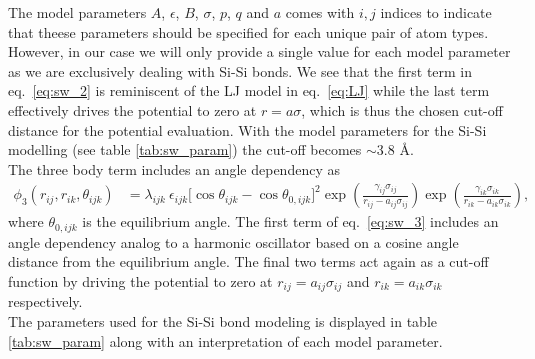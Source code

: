 The model parameters $A$, $\epsilon$, $B$, $\sigma$, $p$, $q$ and $a$ comes with $i,j$ indices to indicate that theese parameters should be specified for each unique pair of atom types. However, in our case we will only provide a single value for each model parameter as we are exclusively dealing with Si-Si bonds. We see that the first term in eq.~\eqref{eq:sw_2} is reminiscent of the LJ model in eq.~\eqref{eq:LJ} while the last term effectively drives the potential to zero at $r=a\sigma$, which is thus the chosen cut-off distance for the potential evaluation. With the model parameters for the Si-Si modelling (see table \ref{tab:sw_param}) the cut-off becomes $\sim 3.8$ Å. \\
The three body term includes an angle dependency as
\begin{align}
  \phi_3(r_{ij}, r_{ik}, \theta_{ijk}) &= \lambda_{ijk} \ \epsilon_{ijk} \Big[\cos \theta_{ijk}-\cos \theta_{0,ijk}\Big]^2 \exp (\frac{\gamma_{ij} \sigma_{ij}}{r_{ij} - a_{ij} \sigma_{ij}}) \exp (\frac{\gamma_{ik} \sigma_{ik}}{r_{ik} - a_{ik} \sigma_{ik}}),
  \label{eq:sw_3}
\end{align}
where $\theta_{0,ijk}$ is the equilibrium angle. The first term of eq.~\eqref{eq:sw_3} includes an angle dependency analog to a harmonic oscillator based on a cosine angle distance from the equilibrium angle. The final two terms act again as a cut-off function by driving the potential to zero at $r_{ij} = a_{ij}\sigma_{ij}$ and $r_{ik} = a_{ik}\sigma_{ik}$ respectively. \\ 
The parameters used for the Si-Si bond modeling is displayed in table \ref{tab:sw_param} along with an interpretation of each model parameter.



